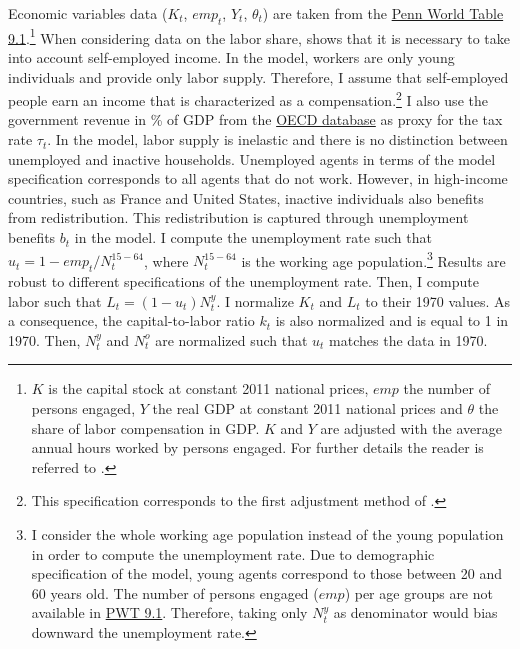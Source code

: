 Economic variables data ($K_t$, $emp_t$, $Y_t$, $\theta_t$) are taken from the \href{https://www.rug.nl/ggdc/productivity/pwt/}{Penn World Table 9.1}.\footnote{$K$ is the capital stock at constant 2011 national prices, $emp$ the number of persons engaged, $Y$ the real GDP at constant 2011 national prices and $\theta$ the share of labor compensation in GDP. $K$ and $Y$ are adjusted with the average annual hours worked by persons engaged. For further details the reader is referred to \cite{Feenstra2015}.} 
When considering data on the labor share, \cite{Gollin2002} shows that it is necessary to take into account self-employed income. In the model, workers are only young individuals and provide only labor supply. Therefore, I assume that self-employed people earn an income that is characterized as a compensation.\footnote{This specification corresponds to the first adjustment method of \cite{Feenstra2015}.}
I also use the government revenue in \% of GDP from the \href{https://data.oecd.org/tax/tax-revenue.htm}{OECD database} as proxy for the tax rate $\tau_t$.
In the model, labor supply is inelastic and there is no distinction between unemployed and inactive households. Unemployed agents in terms of the model specification corresponds to all agents that do not work. However, in high-income countries, such as France and United States, inactive individuals also benefits from redistribution. This redistribution is captured through unemployment benefits $b_t$ in the model.
I compute the unemployment rate such that $u_t = 1 - emp_t/N^{15-64}_t$, where $N_t^{15-64}$ is the working age population.\footnote{I consider the whole working age population instead of the young population in order to compute the unemployment rate. Due to demographic specification of the model, young agents correspond to those between 20 and 60 years old. The number of persons engaged ($emp$) per age groups are not available in \href{https://www.rug.nl/ggdc/productivity/pwt/}{PWT 9.1}. Therefore, taking only $N^y_t$ as denominator would bias downward the unemployment rate.} Results are robust to different specifications of the unemployment rate.
Then, I compute labor such that $L_t=(1-u_t)N_t^y$. I normalize $K_t$ and $L_t$ to their 1970 values. As a consequence, the capital-to-labor ratio $k_t$ is also normalized and is equal to 1 in 1970. Then, $N_t^y$ and $N_t^o$ are normalized such that $u_t$ matches the data in 1970.

